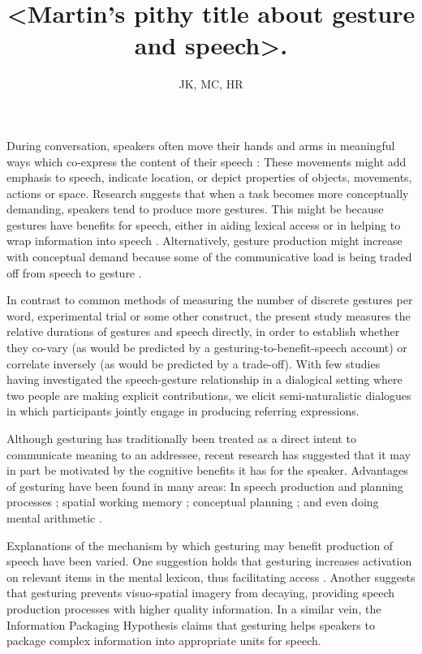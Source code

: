 \documentclass[a4paper,man,natbib]{apa6}
\title{<Martin's pithy title about gesture and speech>.}
\author{JK, MC, HR}
\affiliation{Psychology, PPLS, University of Edinburgh}
\begin{document}
\maketitle

\noindent
During conversation, speakers often move their hands and arms in meaningful ways which co-express the content of their speech \citep{McNeill1992}: %
These movements might add emphasis to speech, indicate location, or depict properties of objects, movements, actions or space.
Research suggests that when a task becomes more conceptually demanding, speakers tend to produce more gestures.
This might be because gestures have benefits for speech, either in aiding lexical access \citep{Rauscher1996, Krauss2000} or in helping to wrap information into speech \citep{Kita2000}.
Alternatively, gesture production might increase with conceptual demand because some of the communicative load is being traded off from speech to gesture \citep{Melinger2004, Bangerter2004, DeRuiter2006}.

In contrast to common methods of measuring the number of discrete gestures per word, experimental trial or some other construct, the present study measures the relative durations of gestures and speech directly, in order to establish whether they co-vary (as would be predicted by a gesturing-to-benefit-speech account) or correlate inversely (as would be predicted by a trade-off).
With few studies having investigated the speech-gesture relationship in a dialogical setting where two people are making explicit contributions, we elicit semi-naturalistic dialogues in which participants jointly engage in producing referring expressions.

Although gesturing has traditionally been treated as a direct intent to communicate meaning to an addressee, recent research has suggested that it may in part be motivated by the cognitive benefits it has for the speaker.
Advantages of gesturing have been found in many areas: In speech production and planning processes \citep{Rauscher1996, Krauss1999, Rose2001, Morsella2004, Kita2000}; spatial working memory \citep{Wesp2001, Morsella2004}; conceptual planning \citep{Melinger2007}; and even doing mental arithmetic \citep{Goldin-Meadow2001}.

Explanations of the mechanism by which gesturing may benefit production of speech have been varied. 
One suggestion holds that gesturing increases activation on relevant items in the mental lexicon, thus facilitating access \citep{Krauss2000}. 
Another \citep{Hadar1997} suggests that gesturing prevents visuo-spatial imagery from decaying, providing speech production processes with higher quality information. 
In a similar vein, the Information Packaging Hypothesis \citep{Kita2000, Kita2003} claims that gesturing helps speakers to package complex information into appropriate units for speech. 
\end{document}
